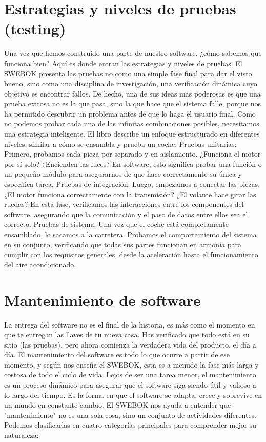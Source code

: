 \section{Estrategias y niveles de pruebas (testing)}
Una vez que hemos construido una parte de nuestro software, ¿cómo sabemos que funciona bien? Aquí es donde entran las estrategias y niveles de pruebas. El SWEBOK presenta las pruebas no como una simple fase final para dar el visto bueno, sino como una disciplina de investigación, una verificación dinámica cuyo objetivo es encontrar fallos. De hecho, una de sus ideas más poderosas es que una prueba exitosa no es la que pasa, sino la que hace que el sistema falle, porque nos ha permitido descubrir un problema antes de que lo haga el usuario final.
Como no podemos probar cada una de las infinitas combinaciones posibles, necesitamos una estrategia inteligente. El libro describe un enfoque estructurado en diferentes niveles, similar a cómo se ensambla y prueba un coche:
Pruebas unitarias: Primero, probamos cada pieza por separado y en aislamiento. ¿Funciona el motor por sí solo? ¿Encienden las luces? En software, esto significa probar una función o un pequeño módulo para asegurarnos de que hace correctamente su única y específica tarea.
Pruebas de integración: Luego, empezamos a conectar las piezas. ¿El motor funciona correctamente con la transmisión? ¿El volante hace girar las ruedas? En esta fase, verificamos las interacciones entre los componentes del software, asegurando que la comunicación y el paso de datos entre ellos sea el correcto.
Pruebas de sistema: Una vez que el coche está completamente ensamblado, lo sacamos a la carretera. Probamos el comportamiento del sistema en su conjunto, verificando que todas sus partes funcionan en armonía para cumplir con los requisitos generales, desde la aceleración hasta el funcionamiento del aire acondicionado.
\section{Mantenimiento de software}
La entrega del software no es el final de la historia, es más como el momento en que te entregan las llaves de tu nueva casa. Has verificado que todo está en su sitio (las pruebas), pero ahora comienza la verdadera vida del producto, el día a día. El mantenimiento del software es todo lo que ocurre a partir de ese momento, y según nos enseña el SWEBOK, esta es a menudo la fase más larga y costosa de todo el ciclo de vida.
Lejos de ser una tarea menor, el mantenimiento es un proceso dinámico para asegurar que el software siga siendo útil y valioso a lo largo del tiempo. Es la forma en que el software se adapta, crece y sobrevive en un mundo en constante cambio.
El SWEBOK nos ayuda a entender que "mantenimiento" no es una sola cosa, sino un conjunto de actividades diferentes. Podemos clasificarlas en cuatro categorías principales para comprender mejor su naturaleza:

